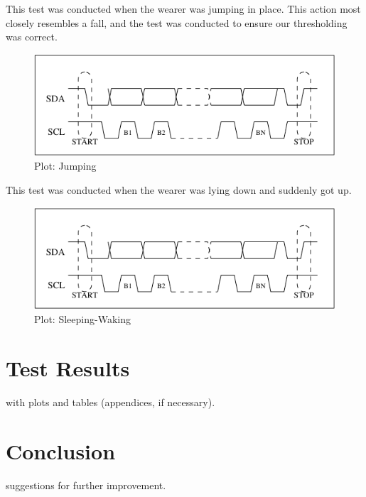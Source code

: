 \documentclass[11pt, a4paper]{article}
\begin{document}
\noindent This test was conducted when the wearer was jumping in place. This
action most closely resembles a fall, and the test was conducted to ensure our
thresholding was correct.
\begin{figure}
    \centering
    \includegraphics[width=\linewidth]{I2C_Timing.pdf}
    \caption{Plot: Jumping}
    \label{fig:jumping}
\end{figure}

\noindent This test was conducted when the wearer was lying down and suddenly
got up.
\begin{figure}
    \centering
    \includegraphics[width=\linewidth]{I2C_Timing.pdf}
    \caption{Plot: Sleeping-Waking}
    \label{fig:sleeping}
\end{figure}

\section{Test Results}
with plots and tables (appendices, if necessary).

\section{Conclusion}
suggestions for further improvement.




\end{document}
